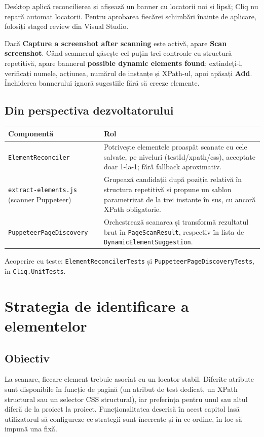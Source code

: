 \documentclass[12pt,a4paper]{report}
\newcommand{\UI}[1]{\textbf{#1}}
\newcommand{\File}[1]{\nolinkurl{#1}}
\begin{document}
Desktop aplică reconcilierea și afișează un banner cu locatorii noi și lipsă; Cliq nu repară automat locatorii. Pentru aprobarea fiecărei schimbări înainte de aplicare, folosiți staged review din Visual Studio.

Dacă \UI{Capture a screenshot after scanning} este activă, apare \UI{Scan screenshot}. Când scannerul găsește cel puțin trei controale cu structură repetitivă, apare bannerul \UI{possible dynamic elements found}; extindeți-l, verificați numele, acțiunea, numărul de instanțe și XPath-ul, apoi apăsați \UI{Add}. Închiderea bannerului ignoră sugestiile fără să creeze elemente.

\section{Din perspectiva dezvoltatorului}

\begin{tabularx}{\textwidth}{@{}p{5.3cm}Y@{}}
\toprule \textbf{Componentă} & \textbf{Rol} \\
\midrule
\File{ElementReconciler} & Potrivește elementele proaspăt scanate cu cele salvate, pe niveluri (testId/xpath/css), acceptate doar 1-la-1; fără fallback aproximativ. \\
\File{extract-elements.js} (scanner Puppeteer) & Grupează candidații după poziția relativă în structura repetitivă și propune un șablon parametrizat de la trei instanțe în sus, cu ancoră XPath obligatorie. \\
\File{PuppeteerPageDiscovery} & Orchestrează scanarea și transformă rezultatul brut în \File{PageScanResult}, respectiv în lista de \File{DynamicElementSuggestion}. \\
\bottomrule
\end{tabularx}

Acoperire cu teste: \File{ElementReconcilerTests} și \File{PuppeteerPageDiscoveryTests}, în \File{Cliq.UnitTests}.

\chapter[Strategia de identificare]{Strategia de identificare a elementelor}

\section{Obiectiv}

La scanare, fiecare element trebuie asociat cu un locator stabil. Diferite atribute sunt disponibile în funcție de pagină (un atribut de test dedicat, un XPath structural sau un selector CSS structural), iar preferința pentru unul sau altul diferă de la proiect la proiect. Funcționalitatea descrisă în acest capitol lasă utilizatorul să configureze ce strategii sunt încercate și în ce ordine, în loc să impună una fixă.
\end{document}
